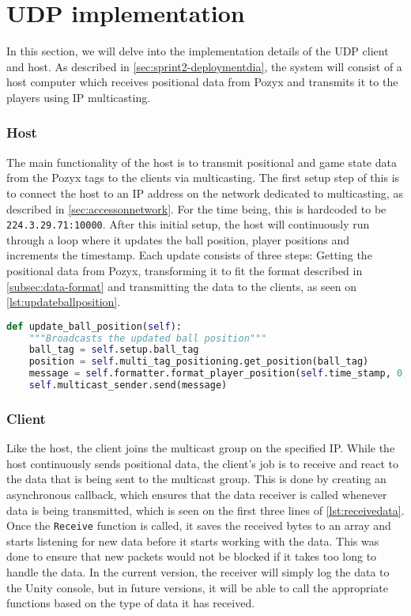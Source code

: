 \section{UDP implementation}
In this section, we will delve into the implementation details of the UDP client and host.
As described in \autoref{sec:sprint2-deploymentdia}, the system will consist of a host computer which receives positional data from Pozyx and transmits it to the players using IP multicasting.

\subsubsection{Host}
The main functionality of the host is to transmit positional and game state data from the Pozyx tags to the clients via multicasting.
The first setup step of this is to connect the host to an IP address on the network dedicated to multicasting, as described in \autoref{sec:accessonnetwork}.
For the time being, this is hardcoded to be \texttt{224.3.29.71:10000}.
After this initial setup, the host will continuously run through a loop where it updates the ball position, player positions and increments the timestamp.
\noindent
Each update consists of three steps: Getting the positional data from Pozyx, transforming it to fit the format described in \autoref{subsec:data-format} and transmitting the data to the clients, as seen on \autoref{lst:updateballposition}.

\begin{lstlisting}[caption={Updating ball position}, captionpos=b,language=Python,label={lst:updateballposition}]
def update_ball_position(self):
    """Broadcasts the updated ball position"""
    ball_tag = self.setup.ball_tag
    position = self.multi_tag_positioning.get_position(ball_tag)
    message = self.formatter.format_player_position(self.time_stamp, 0, position.x, position.y)
    self.multicast_sender.send(message)
\end{lstlisting}

\subsubsection{Client}
Like the host, the client joins the multicast group on the specified IP.
While the host continuously sends positional data, the client's job is to receive and react to the data that is being sent to the multicast group.
This is done by creating an asynchronous callback, which ensures that the data receiver is called whenever data is being transmitted, which is seen on the first three lines of \autoref{lst:receivedata}.
Once the \texttt{Receive} function is called, it saves the received bytes to an array and starts listening for new data before it starts working with the data.
This was done to ensure that new packets would not be blocked if it takes too long to handle the data.
In the current version, the receiver will simply log the data to the Unity console, but in future versions, it will be able to call the appropriate functions based on the type of data it has received.

